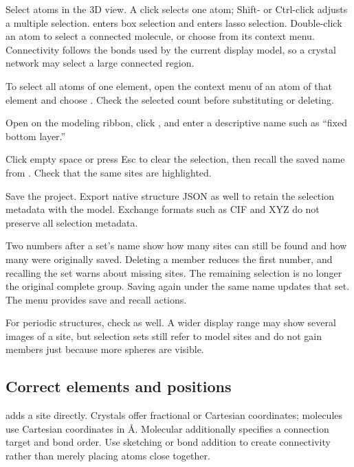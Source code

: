 \begin{steps}
  \item Select atoms in the 3D view. A click selects one atom; Shift- or Ctrl-click adjusts a multiple selection.  enters box selection and  enters lasso selection. Double-click an atom to select a connected molecule, or choose  from its context menu. Connectivity follows the bonds used by the current display model, so a crystal network may select a large connected region.
  \item To select all atoms of one element, open the context menu of an atom of that element and choose . Check the selected count before substituting or deleting.
  \item Open  on the modeling ribbon, click , and enter a descriptive name such as ``fixed bottom layer.''
  \item Click empty space or press Esc to clear the selection, then recall the saved name from . Check that the same sites are highlighted.
  \item Save the project. Export native structure JSON as well to retain the selection metadata with the model. Exchange formats such as CIF and XYZ do not preserve all selection metadata.
\end{steps}

Two numbers after a set's name show how many sites can still be found and how many were originally saved. Deleting a member reduces the first number, and recalling the set warns about missing sites. The remaining selection is no longer the original complete group. Saving again under the same name updates that set. The menu provides save and recall actions.

For periodic structures, check  as well. A wider display range may show several images of a site, but selection sets still refer to model sites and do not gain members just because more spheres are visible.

\subsection{Correct elements and positions}\label{sec:atom-edit-reference}

 adds a site directly. Crystals offer fractional or Cartesian coordinates; molecules use Cartesian coordinates in \AA. Molecular  additionally specifies a connection target and bond order. Use sketching or bond addition to create connectivity rather than merely placing atoms close together.

